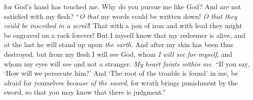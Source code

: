 \begin{biblechapter}
for God’s hand has touched me.
\verse Why do you pursue me like God? 
And are not satisfied with my flesh?
\verse “\textit{O that} my words could be written down! 
\textit{O that they could be inscribed in a scroll}!
\verse That with a pen of iron and with lead 
they might be engraved on a rock forever!
\verse But I myself know that my redeemer is alive, 
and at the last he will stand up upon \textit{the earth}.
\verse And after my skin has been thus destroyed, 
but from my flesh I will see God,
\verse whom \textit{I will see for myself}, 
and whom my eyes will see and not a stranger. 
\textit{My heart faints within me}.
\verse “If you say, ‘How will we persecute him?’ 
And ‘The root of the trouble is found’ in me,
\verse be afraid for yourselves \textit{because of the sword}, 
for wrath brings punishment by the sword, 
so that you may know that there is judgment.”
\end{biblechapter}

